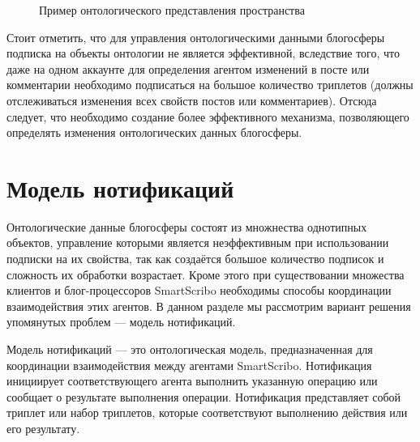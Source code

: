\begin{figure}[h]
\centerline{
}
\caption{Пример онтологического представления пространства}
\label{ont-example}
\end{figure}

Стоит отметить, что для управления онтологическими данными блогосферы подписка на объекты онтологии не является эффективной, вследствие того, что даже на одном аккаунте для определения агентом изменений в посте или комментарии необходимо подписаться на большое количество триплетов (должны отслеживаться изменения всех свойств постов или комментариев). Отсюда следует, что необходимо создание более эффективного механизма, позволяющего определять изменения онтологических данных блогосферы.

\section{Модель нотификаций} 

Онтологические данные блогосферы состоят из множнества однотипных объектов, управление которыми является неэффективным при использовании подписки на их свойства, так как создаётся большое количество подписок и сложность их обработки возрастает. Кроме этого при существовании множества клиентов и блог-процессоров SmartScribo необходимы способы координации взаимодействия этих агентов. В данном разделе мы рассмотрим вариант решения упомянутых проблем --- модель нотификаций.

Модель нотификаций --- это онтологическая модель, предназначенная для координации взаимодействия между агентами SmartScribo. Нотификация инициирует соответствующего агента выполнить указанную операцию или сообщает о результате выполнения операции. Нотификация представляет собой триплет или набор триплетов, которые соответствуют выполнению действия или его результату.

